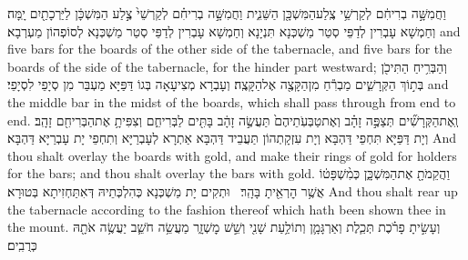 {וַחֲמִשָּׁ֣ה בְרִיחִ֔ם לְקַרְשֵׁ֥י צֶֽלַע\maqqaf הַמִּשְׁכָּ֖ן הַשֵּׁנִ֑ית וַחֲמִשָּׁ֣ה בְרִיחִ֗ם לְקַרְשֵׁי֙ צֶ֣לַע הַמִּשְׁכָּ֔ן לַיַּרְכָתַ֖יִם יָֽמָּה׃}
{וְחַמְשָׁא עָבְרִין לְדַפֵּי סְטַר מַשְׁכְּנָא תִּנְיָנָא וְחַמְשָׁא עָבְרִין לְדַפֵּי סְטַר מַשְׁכְּנָא לְסוֹפְהוֹן מַעְרְבָא׃}
{and five bars for the boards of the other side of the tabernacle, and five bars for the boards of the side of the tabernacle, for the hinder part westward;}{}
{וְהַבְּרִ֥יחַ הַתִּיכֹ֖ן בְּת֣וֹךְ הַקְּרָשִׁ֑ים מַבְרִ֕חַ מִן\maqqaf הַקָּצֶ֖ה אֶל\maqqaf הַקָּצֶֽה׃}
{וְעָבְרָא מְצִיעָאָה בְּגוֹ דַּפַּיָּא מַעְבַּר מִן סְיָפֵי לִסְיָפֵי׃}
{and the middle bar in the midst of the boards, which shall pass through from end to end.}{}
{וְֽאֶת\maqqaf הַקְּרָשִׁ֞ים תְּצַפֶּ֣ה זָהָ֗ב וְאֶת\maqqaf טַבְּעֹֽתֵיהֶם֙ תַּעֲשֶׂ֣ה זָהָ֔ב בָּתִּ֖ים לַבְּרִיחִ֑ם וְצִפִּיתָ֥ אֶת\maqqaf הַבְּרִיחִ֖ם זָהָֽב׃}
{וְיָת דַּפַּיָּא תִּחְפֵי דַּהְבָּא וְיָת עִזְקָתְהוֹן תַּעֲבֵיד דַּהְבָּא אַתְרָא לְעָבְרַיָּא וְתִחְפֵי יָת עָבְרַיָּא דַּהְבָּא׃}
{And thou shalt overlay the boards with gold, and make their rings of gold for holders for the bars; and thou shalt overlay the bars with gold.}{}
{וַהֲקֵמֹתָ֖ אֶת\maqqaf הַמִּשְׁכָּ֑ן כְּמִ֨שְׁפָּט֔וֹ אֲשֶׁ֥ר הׇרְאֵ֖יתָ בָּהָֽר׃ \setuma }
{וּתְקִים יָת מַשְׁכְּנָא כְּהִלְכְּתֵיהּ דְּאִתַּחְזִיתָא בְּטוּרָא׃}
{And thou shalt rear up the tabernacle according to the fashion thereof which hath been shown thee in the mount.}{}
{וְעָשִׂ֣יתָ פָרֹ֗כֶת תְּכֵ֧לֶת וְאַרְגָּמָ֛ן וְתוֹלַ֥עַת שָׁנִ֖י וְשֵׁ֣שׁ מׇשְׁזָ֑ר מַעֲשֵׂ֥ה חֹשֵׁ֛ב יַעֲשֶׂ֥ה אֹתָ֖הּ כְּרֻבִֽים׃}
